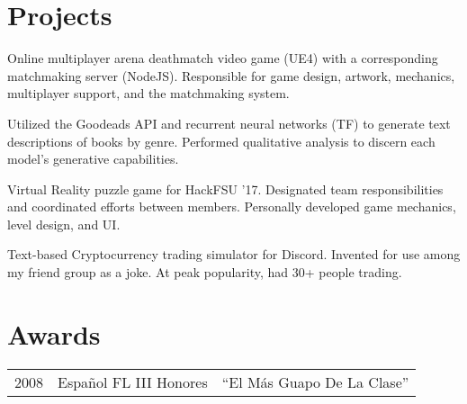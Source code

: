 \documentclass[]{deedy_resume}
\begin{document}
\begin{minipage}[t]{0.63\textwidth}
\section{Projects}
Online multiplayer arena deathmatch video game (UE4) with a corresponding matchmaking server (NodeJS). Responsible for game design, artwork, mechanics, multiplayer support, and the matchmaking system.
\sectionsep

Utilized the Goodeads API and recurrent neural networks (TF) to generate text descriptions of books by genre. Performed qualitative analysis to discern each model's generative capabilities.
\sectionsep

Virtual Reality puzzle game for HackFSU '17. Designated team responsibilities and coordinated efforts between members. Personally developed game mechanics, level design, and  UI.
\sectionsep

Text-based Cryptocurrency trading simulator for Discord. Invented for use among my friend group as a joke. At peak popularity, had 30+ people trading.
\sectionsep


\section{Awards} 
\begin{tabular}{rll}
2008	 & Espa\~nol FL III Honores  & ``El M\'as Guapo De La Clase'' \\
\end{tabular}
\sectionsep


\begin{comment}
\section{Publications} 
\renewcommand\refname{\vskip -1.5cm} %


\nocite{*}
\end{comment}

\end{minipage} 
\end{document}
